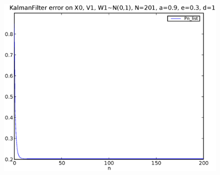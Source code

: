 \documentclass[a4paper,10pt]{article}
\begin{document}
\begin{figure}
\includegraphics[width=1\textwidth]{hw10_2_error_N_201_a_0.9_e_0.3_d_1.eps}
\caption{}\label{f6}
\end{figure}
\end{document}
